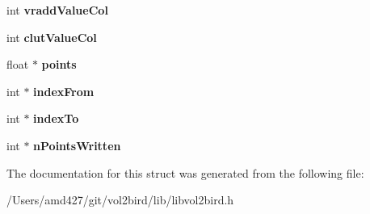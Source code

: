 \begin{DoxyCompactItemize}
int {\bfseries vradd\+Value\+Col}
\item 
\mbox{\label{structvol2birdPoints_a9511be675ae9cd304c851ac665eb7e1d}} 
int {\bfseries clut\+Value\+Col}
\item 
\mbox{\label{structvol2birdPoints_a9f271be9d4d4544c125c111952e8ae88}} 
float $\ast$ {\bfseries points}
\item 
\mbox{\label{structvol2birdPoints_a025776146771774dd48ae1599ecccb5b}} 
int $\ast$ {\bfseries index\+From}
\item 
\mbox{\label{structvol2birdPoints_a306c6c05b1d1ca70b901358f46c10c08}} 
int $\ast$ {\bfseries index\+To}
\item 
\mbox{\label{structvol2birdPoints_a73339d6e4221e8c25cdf1c6c3ab3273c}} 
int $\ast$ {\bfseries n\+Points\+Written}
\end{DoxyCompactItemize}


The documentation for this struct was generated from the following file\+:\begin{DoxyCompactItemize}
\item 
/\+Users/amd427/git/vol2bird/lib/libvol2bird.\+h\end{DoxyCompactItemize}
